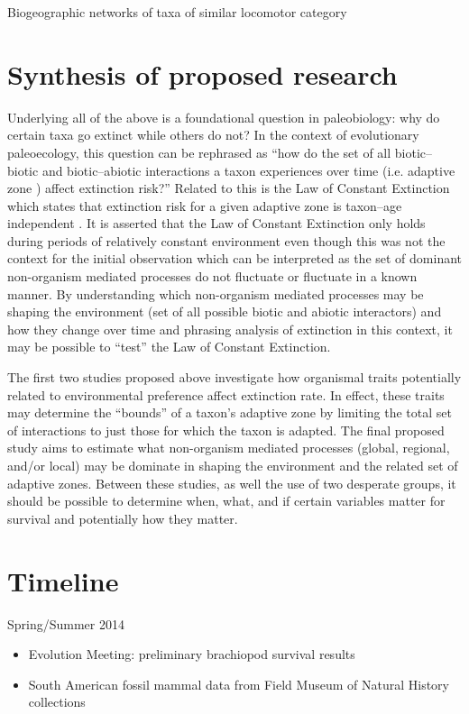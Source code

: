 \documentclass[12pt,letterpaper]{article}
\begin{document}
Biogeographic networks of taxa of similar locomotor category

\clearpage

\section{Synthesis of proposed research} \label{sec:synth}
Underlying all of the above is a foundational question in paleobiology: why do certain taxa go extinct while others do not? In the context of evolutionary paleoecology, this question can be rephrased as ``how do the set of all biotic--biotic and biotic--abiotic interactions a taxon experiences over time (i.e. adaptive zone \citealp{Simpson1944}) affect extinction risk?'' Related to this is the Law of Constant Extinction which states that extinction risk for a given adaptive zone is taxon--age independent \citep{VanValen1973}. It is asserted that the Law of Constant Extinction only holds during periods of relatively constant environment even though this was not the context for the initial observation \citep{Liow2007b,VanValen1973} which can be interpreted as the set of dominant non-organism mediated processes do not fluctuate or fluctuate in a known manner. By understanding which non-organism mediated processes may be shaping the environment (set of all possible biotic and abiotic interactors) and how they change over time and phrasing analysis of extinction in this context, it may be possible to ``test'' the Law of Constant Extinction.

The first two studies proposed above investigate how organismal traits potentially related to environmental preference affect extinction rate. In effect, these traits may determine the ``bounds'' of a taxon's adaptive zone by limiting the total set of interactions to just those for which the taxon is adapted. The final proposed study aims to estimate what non-organism mediated processes (global, regional, and/or local) may be dominate in shaping the environment and the related set of adaptive zones. Between these studies, as well the use of two desperate groups, it should be possible to determine when, what, and if certain variables matter for survival and potentially how they matter. 

\clearpage

\section{Timeline}

Spring/Summer 2014
\begin{itemize}
  \item Evolution Meeting: preliminary brachiopod survival results
  \item South American fossil mammal data from Field Museum of Natural History collections
\end{itemize}
\end{document}
